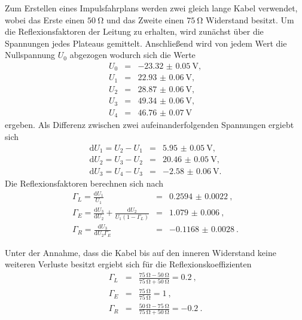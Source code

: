 Zum Erstellen eines Impulsfahrplans werden zwei gleich lange Kabel verwendet, wobei das Erste einen $\SI{50}{\ohm}$ und das Zweite einen $\SI{75}{\ohm}$ Widerstand besitzt.
Um die Reflexionsfaktoren der Leitung zu erhalten, wird zunächst über die Spannungen jedes Plateaus gemittelt.
Anschließend wird von jedem Wert die Nullspannung $U_0$ abgezogen wodurch sich die Werte
\begin{eqnarray*}
	U_0 &=& \SI{-23.32(5)}{\volt},\\
	U_1 &=& \SI{22.93(6)}{\volt},\\
	U_2 &=& \SI{28.87(6)}{\volt},\\
	U_3 &=& \SI{49.34(6)}{\volt},\\
	U_4 &=& \SI{46.76(7)}{\volt}
\end{eqnarray*}
ergeben.
Als Differenz zwischen zwei aufeinanderfolgenden Spannungen ergiebt sich
\begin{eqnarray*}
	\text{d} U_1 = U_2 - U_1 &=& \SI{5.95(5)}{\volt},\\
	\text{d} U_2 = U_3 - U_2 &=& \SI{20.46(5)}{\volt},\\
	\text{d} U_3 = U_4 - U_3 &=& \SI{-2.58(6)}{\volt}.
\end{eqnarray*}
Die Reflexionsfaktoren berechnen sich nach
\begin{eqnarray*}
	\Gamma_L = \frac{\text{d} U_1}{U_1} &=& \SI{0.2594(22)}{},\\
	\Gamma_E = \frac{\text{d} U_3}{\text{d} U_2} + \frac{\text{d} U_2}{U_1(1-\Gamma_L)} &=& \SI{1.079(6)}{},\\
	\Gamma_R = \frac{\text{d} U_3}{\text{d} U_2 \Gamma_E} &=& \SI{-0.1168(28)}{}.
\end{eqnarray*}

Unter der Annahme, dass die Kabel bis auf den inneren Widerstand keine weiteren Verluste besitzt ergiebt sich für die Reflexionskoeffizienten
\begin{eqnarray*}
	\Gamma_L &=& \frac{\SI{75}{\ohm}-\SI{50}{\ohm}}{\SI{75}{\ohm}+\SI{50}{\ohm}} = \SI{0.2}{},\\
	\Gamma_E &=& \frac{\SI{75}{\ohm}}{\SI{75}{\ohm}} = \SI{1}{},\\
	\Gamma_R &=& \frac{\SI{50}{\ohm}-\SI{75}{\ohm}}{\SI{75}{\ohm}+\SI{50}{\ohm}} = \SI{-0.2}{}.
\end{eqnarray*}

